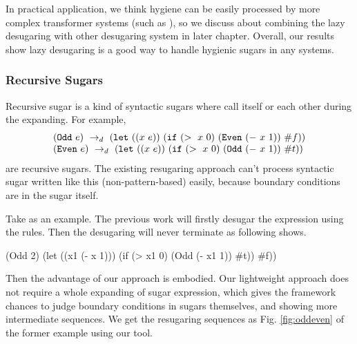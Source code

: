 In practical application, we think hygiene can be easily processed by more complex transformer systems (such as \cite{10.5555/1792878.1792884}), so we discuss about combining the lazy desugaring with other desugaring system in later chapter. Overall, our results show lazy desugaring is a good way to handle hygienic sugars in any systems.

\subsubsection{Recursive Sugars}
\label{sec:recursiveSugar}

Recursive sugar is a kind of syntactic sugars where call itself or each other during the expanding. For example,
\[
\begin{array}{l}
(\mbox{\tt Odd}~e) ~\rightarrow_d~ (\mbox{\tt let}~((x~e))~(\mbox{\tt if}~(>~x~0)~(\mbox{\tt Even}~(-~x~1))~\#f))\\
(\mbox{\tt Even}~e) ~\rightarrow_d~ (\mbox{\tt let}~((x~e))~(\mbox{\tt if}~(>~x~0)~(\mbox{\tt Odd}~(-~x~1))~\#t))
\end{array}
\]
are recursive sugars. The existing resugaring approach can't process syntactic sugar written like this (non-pattern-based) easily, because boundary conditions are in the sugar itself.

Take  as an example. The previous work will firstly desugar the expression using the rules. Then the desugaring will never terminate as following shows.
\begin{footnotesize}
\begin{Codes}
   (Odd 2)
\qquad\quad(let ((x1 (- x 1))) (if (> x1 0) (Odd (- x1 1)) \#t))
\qquad\quad\#f))
\end{Codes}
\end{footnotesize}



Then the advantage of our approach is embodied. Our lightweight approach does not require a whole expanding of sugar expression, which gives the framework chances to judge boundary conditions in sugars themselves, and showing more intermediate sequences. We get the resugaring sequences as Fig.  \ref{fig:oddeven} of the former example using our tool.



